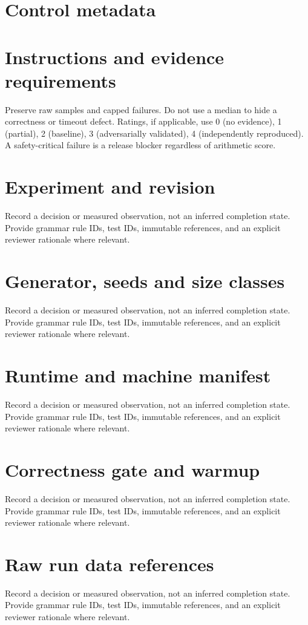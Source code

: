 \documentclass[11pt,letterpaper]{article}
\begin{document}
\makedoctitle\makedocsummary
\tableofcontents\clearpage
\section{Control metadata}
\section{Instructions and evidence requirements}
Preserve raw samples and capped failures. Do not use a median to hide a correctness or timeout defect. Ratings, if applicable, use 0 (no evidence), 1 (partial), 2 (baseline), 3 (adversarially validated), 4 (independently reproduced). A safety-critical failure is a release blocker regardless of arithmetic score.
\section{Experiment and revision}
Record a decision or measured observation, not an inferred completion state. Provide grammar rule IDs, test IDs, immutable references, and an explicit reviewer rationale where relevant.
\section{Generator, seeds and size classes}
Record a decision or measured observation, not an inferred completion state. Provide grammar rule IDs, test IDs, immutable references, and an explicit reviewer rationale where relevant.
\section{Runtime and machine manifest}
Record a decision or measured observation, not an inferred completion state. Provide grammar rule IDs, test IDs, immutable references, and an explicit reviewer rationale where relevant.
\section{Correctness gate and warmup}
Record a decision or measured observation, not an inferred completion state. Provide grammar rule IDs, test IDs, immutable references, and an explicit reviewer rationale where relevant.
\section{Raw run data references}
Record a decision or measured observation, not an inferred completion state. Provide grammar rule IDs, test IDs, immutable references, and an explicit reviewer rationale where relevant.
\end{document}
